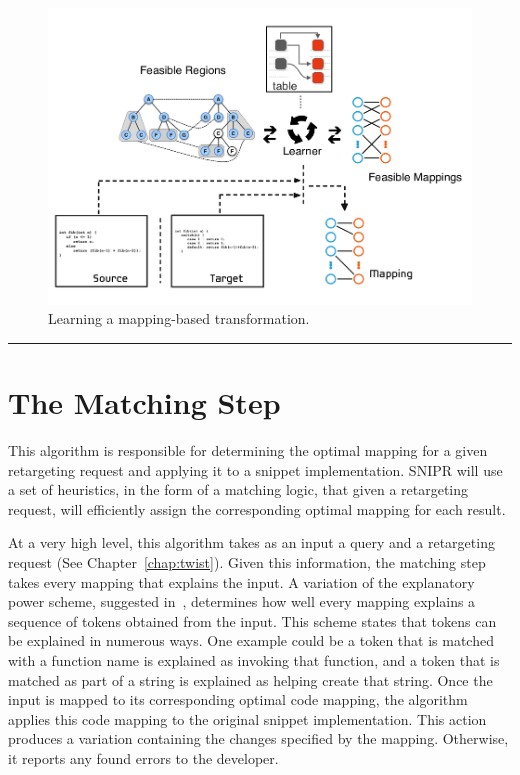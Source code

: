 \begin{figure}[!ht]
    \centering
    \includegraphics[width=\textwidth]{images/mappinggeneration}
    \caption{Learning a mapping-based transformation.}
    \label{fig:mappinggeneration}
\end{figure}

\fancybreak{\pfbreakdisplay}

\section{The Matching Step}
\label{sec:matching}

This algorithm is responsible for determining the optimal mapping for a given retargeting request and applying it to a snippet implementation. \uppercase{SNIPR} will use a set of heuristics, in the form of a matching logic, that given a retargeting request, will efficiently assign the corresponding optimal mapping for each result. 

At a very high level, this algorithm takes as an input a query and a retargeting request (See Chapter~\ref{chap:twist}). Given this information, the matching step takes every mapping that explains the input. A variation of the explanatory power scheme, suggested in~\cite{Little:2008hr}, determines how well every mapping explains a sequence of tokens obtained from the input. This scheme states that tokens can be explained in numerous ways. One example could be a token that is matched with a function name is explained as invoking that function, and a token that is matched as part of a string is explained as helping create that string. Once the input is mapped to its corresponding optimal code mapping, the algorithm applies this code mapping to the original snippet implementation. This action produces a variation containing the changes specified by the mapping. Otherwise, it reports any found errors to the developer.

